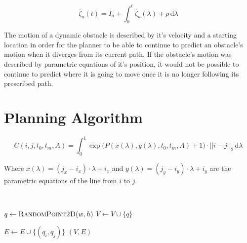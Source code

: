 \begin{equation}
    \tilde{\zeta_a}(t) = I_a + \int_{0}^{t} \dot{\zeta_a}(\lambda)
    + \rho \, \mathrm{d}\lambda
    \label{eq:obs_observed}
\end{equation}

The motion of a dynamic obstacle is described by it's velocity and a starting
location in order for the planner to be able to continue to predict an
obstacle's motion when it diverges from its current path. If the obstacle's
motion was described by parametric equations of it's position, it would not be
possible to continue to predict where it is going to move once it is no longer
following its prescribed path.

\section{Planning Algorithm}

\label{sec:design_planner}


\begin{equation}
    C(i, j, t_0, t_m, A) = \int^1_0 \exp{\Big(
        P(x(\lambda), y(\lambda), t_0, t_m, A) + 1 \Big)
    } \cdot ||i - j||_{2} \,\mathrm{d}\lambda
    \label{eq:cost}
\end{equation}

Where $x(\lambda) = (j_x - i_x) \cdot \lambda + i_x$ and $y(\lambda) = (j_y -
i_y) \cdot \lambda + i_y$ are the parametric equations of the line from $i$ to
$j$.


\begin{algorithm}[ht]
    \caption{$\Function{Roadmap}(n, d, w, h, O)$}
    \\
    \label{algo:prm}
    \begin{algorithmic}[1]
        \setcounter{ALC@line}{0}
        \vspace*{1mm}

            \STATE $q \leftarrow \Function{RandomPoint2D}(w, h)$
                \STATE $V \leftarrow V \cup \{q\}$
            \ENDIF
        \ENDFOR

                    \STATE $E \leftarrow E \cup \{(q_i, q_j)\}$
                \ENDIF
            \ENDFOR
        \ENDFOR
        \RETURN $(V,E)$
    \end{algorithmic}
\end{algorithm}

